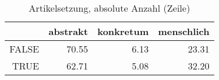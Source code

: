 \begin{table}[ht]
\centering
\begin{tabular}{rrrr}
  \hline
 & abstrakt & konkretum & menschlich \\ 
  \hline
FALSE & 70.55 & 6.13 & 23.31 \\ 
  TRUE & 62.71 & 5.08 & 32.20 \\ 
   \hline
\end{tabular}
\caption{Artikelsetzung, absolute Anzahl (Zeile)} 
\end{table}
